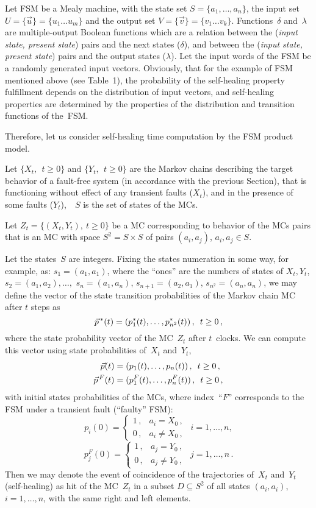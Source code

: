 \begin{multicols}{2}
Let FSM be a Mealy machine, with the state set
$S=\{a_1,\ldots,a_n\}$,
the input set $U=\{\vec u\}=\{u_1\ldots u_m\}$
and the output set $V=\{\vec v\}=\{v_1\ldots v_k\}$.
Functions~$\delta$ and~$\lambda$ are multiple-output Boolean
functions which are a relation between the ({\it input state,
present state}) pairs and the next states ($\delta$),
and between the (\textit{input state, present state}) pairs
and the output states ($\lambda$).
Let the input words of the FSM be a randomly generated
input vectors.
Obviously, that for the example of FSM mentioned above
(see Table~1), the probability of the self-healing property
fulfillment depends on the distribution of input vectors,
and self-healing properties are determined by the
properties of the distribution and transition functions
of the~FSM.

Therefore, let us consider self-healing time
computation by the FSM product model.

Let $\{X_t,\ \ t\ge0\}$ and $\{Y_t,\ \  t\ge0\}$ are the Markov
chains describing the target behavior of a fault-free system  (in
accordance with the previous Section), that is functioning without
effect of any transient faults ($X_t$), and in the presence of
some faults ($Y_t$),\ \ $S$ is the set of states of the MCs.

Let $Z_t=\{(X_t,Y_t), \ t\ge0\}$ be a MC corresponding to
behavior of the MCs pairs that is an MC with space
$S^2=S\times S$ of pairs $(a_i,a_j)$, $a_i,a_j\in S$.

Let the states~$S$ are integers.
Fixing  the states numeration in  some way,
for example, as: $s_1=(a_1,a_1)$,
where the ``ones'' are the numbers of states of
$X_t,Y_t$,  $s_2=(a_1,a_2),\ldots,$  $s_n=(a_1,a_n)$,
$s_{n+1}=(a_2,a_1)$, $s_{n^2}=(a_n,a_n)$, we may define
the vector of the state transition probabilities of
the Markov chain MC after $t$ steps as
$$
\vec p^{\,*}(t)=(p_{1}^*(t),\ldots,p_{n^2}^*(t))\,,
\enskip t\ge 0\,,
$$
where the state probability vector of the MC~$Z_t$
after $t$~clocks.
We can compute  this vector  using state
probabilities of~$X_t$ and~$Y_t$,
\begin{align*}
\vec p(t)&=(p_{1}(t),\ldots,p_{n}(t))\,,
\enskip  t\ge 0\,,
\\
\vec p^{\,F}(t)&=(p_{1}^F(t),\ldots,p_{n}^F(t))\,,
\enskip t\ge 0\,,
\end{align*}
with initial  states probabilities of the MCs,
where index~``$F$'' corresponds to the  FSM under
a transient fault (``faulty'' FSM):
$$
p_{i}(0)
=
\begin{cases}
1\,,      &a_i=X_0\,,   \\
0\,,      &a_i\ne X_0\,,   
\end{cases}
\ \ i=1,\ldots ,n,
$$
$$
p^F_{j}(0)
=
\begin{cases}
1\,,      &a_j=Y_0\,,   \\
0\,,      &a_j\ne Y_0\,,  
\end{cases}
\ \ j=1,\ldots ,n\,.
$$
Then we may denote the event of coincidence of the
trajectories of~$X_t$ and~$Y_t$ (self-healing) as hit
of the MC~$Z_t$ in a subset $D \subseteq S^2$ of all
states $(a_i,a_i)$,\ \ $i=1,\ldots,n$, with the same
right and left elements.


\end{multicols}
